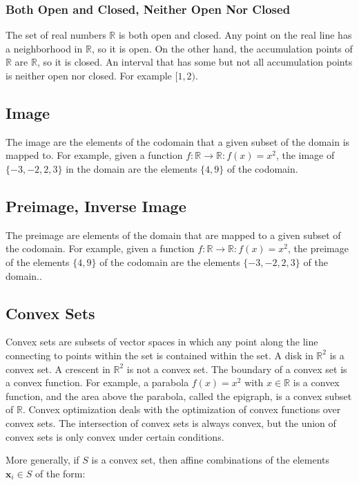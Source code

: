 \subsubsection{Both Open and Closed, Neither Open Nor Closed}
The set of real numbers $\mathbb{R}$ is both open and closed. Any point on the real line has a neighborhood in $\mathbb{R}$, so it is open. On the other hand, the accumulation points of $\mathbb{R}$ are $\mathbb{R}$, so it is closed. An interval that has some but not all accumulation points is neither open nor closed. For example $[1,2)$.	

\subsection{Image}
\label{sec:image}
The image are the elements of the codomain that a given subset of the domain is mapped to. For example, given a function $f:\mathbb{R} \rightarrow \mathbb{R}: f(x) = x^2$, the image of $\{-3,-2,2,3\}$ in the domain are the elements $\{4,9\}$ of the codomain.

\subsection{Preimage, Inverse Image}
\label{sec:preimage}
The preimage are elements of the domain that are mapped to a given subset of the codomain. For example, given a function $f:\mathbb{R} \rightarrow \mathbb{R}: f(x) = x^2$, the preimage of the elements $\{4,9\}$ of the codomain are the elements $\{-3,-2,2,3\}$ of the domain..


\subsection{Convex Sets}
Convex sets are subsets of vector spaces in which any point along the line connecting to points within the set is contained within the set. A disk in $\mathbb{R}^2$ is a convex set. A crescent in $\mathbb{R}^2$ is not a convex set. The boundary of a convex set is a convex function. For example, a parabola $f(x) = x^2$ with $x\in\mathbb{R}$ is a convex function, and the area above the parabola, called the epigraph, is a convex subset of $\mathbb{R}$. Convex optimization deals with the optimization of convex functions over convex sets. The intersection of convex sets is always convex, but the union of convex sets is only convex under certain conditions. 

More generally, if $S$ is a convex set, then affine combinations of the elements $\mathbf{x}_i  \in S$ of the form:


